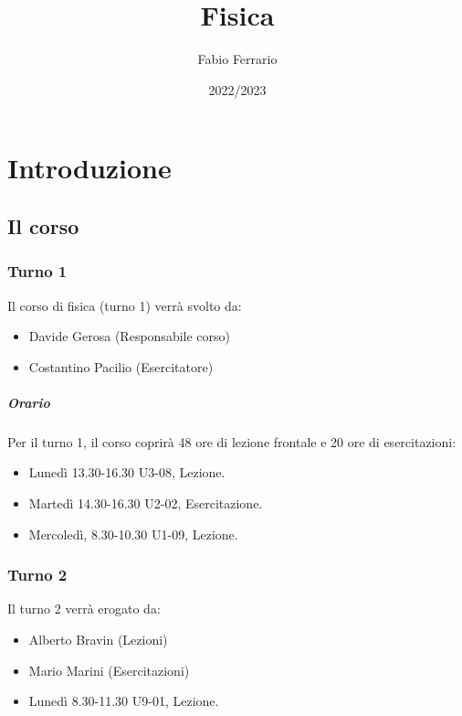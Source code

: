 \documentclass[12pt, a4paper, openany]{book}
\begin{document}
\title{Fisica}
\author{Fabio Ferrario}
\date{2022/2023}
\maketitle

\tableofcontents

\chapter{Introduzione}

\section{Il corso}
\subsection*{Turno 1}
Il corso di fisica (turno 1) verrà svolto da:
\begin{itemize}
    \item Davide Gerosa (Responsabile corso)
    \item Costantino Pacilio (Esercitatore)
\end{itemize} 
\paragraph*{Orario} Per il turno 1, il corso coprirà 48 ore di lezione frontale e 20 ore di esercitazioni:
\begin{itemize}
    \item Lunedì 13.30-16.30 U3-08, Lezione.
    \item Martedì 14.30-16.30 U2-02, Esercitazione.
    \item Mercoledì, 8.30-10.30 U1-09, Lezione.  
\end{itemize}
\subsection*{Turno 2}
Il turno 2 verrà erogato da:
\begin{itemize}
    \item Alberto Bravin (Lezioni)
    \item Mario Marini (Esercitazioni)
\end{itemize}
\begin{itemize}
    \item Lunedì 8.30-11.30 U9-01, Lezione.
 
\end{itemize}
\end{document}
